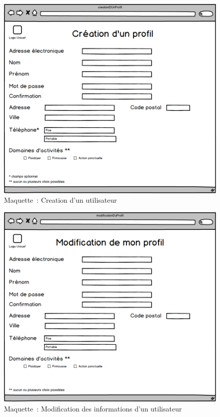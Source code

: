 \begin{figure}[H]
	\centering
	\includegraphics[scale=0.4]{images/maquettes/fonctionnalite1CreationDUnProfil.png}
	 \caption{Maquette~: Creation d'un utilisateur}
 \label{fonctionnalite1creationDUnUtilisateurs}
\end{figure}

\begin{figure}[H]
	\centering
	\includegraphics[scale=0.4]{images/maquettes/fonctionnalite1ModificationDUnProfil.png}
	 \caption{Maquette~: Modification des informations d'un utilisateur}
	 \label{fonctionnalite1modificationDUnProfil}
\end{figure}


